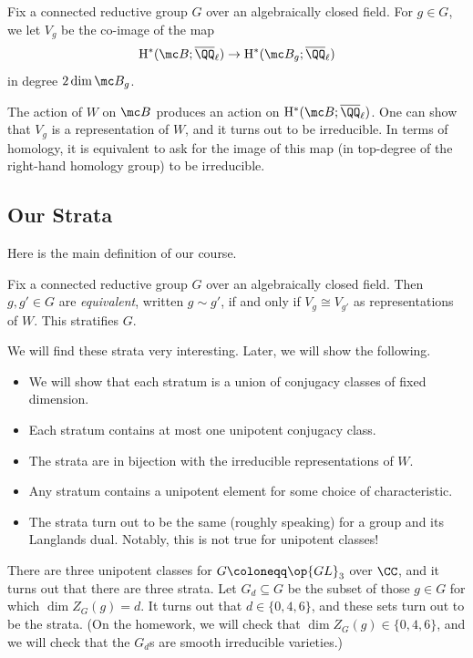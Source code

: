 \documentclass[../notes.tex]{subfiles}
\begin{document}
\begin{notation}
	Fix a connected reductive group $G$ over an algebraically closed field. For $g\in G$, we let $V_g$ be the co-image of the map
	\[\mathrm H^*(\mc B;\overline\QQ_\ell)\to\mathrm H^*(\mc B_g;\overline\QQ_\ell)\]
	in degree $2\dim\mc B_g$.
\end{notation}
\begin{remark}
	The action of $W$ on $\mc B$ produces an action on $\mathrm H^*(\mc B;\overline\QQ_\ell)$. One can show that $V_g$ is a representation of $W$, and it turns out to be irreducible. In terms of homology, it is equivalent to ask for the image of this map (in top-degree of the right-hand homology group) to be irreducible.
\end{remark}

\subsection{Our Strata}
Here is the main definition of our course.
\begin{notation}
	Fix a connected reductive group $G$ over an algebraically closed field. Then $g,g'\in G$ are \textit{equivalent}, written $g\sim g'$, if and only if $V_g\cong V_{g'}$ as representations of $W$. This stratifies $G$.
\end{notation}
We will find these strata very interesting. Later, we will show the following.
\begin{itemize}
	\item We will show that each stratum is a union of conjugacy classes of fixed dimension.
	\item Each stratum contains at most one unipotent conjugacy class.
	\item The strata are in bijection with the irreducible representations of $W$.
	\item Any stratum contains a unipotent element for some choice of characteristic.
	\item The strata turn out to be the same (roughly speaking) for a group and its Langlands dual. Notably, this is not true for unipotent classes!
\end{itemize}
\begin{example}
	There are three unipotent classes for $G\coloneqq\op{GL}_3$ over $\CC$, and it turns out that there are three strata. Let $G_d\subseteq G$ be the subset of those $g\in G$ for which $\dim Z_G(g)=d$. It turns out that $d\in\{0,4,6\}$, and these sets turn out to be the strata. (On the homework, we will check that $\dim Z_G(g)\in\{0,4,6\}$, and we will check that the $G_d$s are smooth irreducible varieties.)
\end{example}
\end{document}
